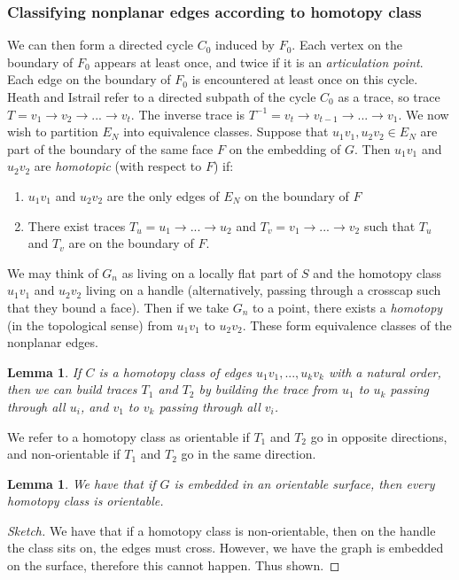 \documentclass[]{report}
\newtheorem{lemma}[theorem]{Lemma}
\theoremstyle{definition}
\numberwithin{theorem}{section}
\numberwithin{equation}{section}
\begin{document}
\subsubsection{Classifying nonplanar edges according to homotopy class}

We can then form a directed cycle $C_0$ induced by $F_0$. Each vertex on the boundary of $F_0$ appears at least once, and twice if it is an \textit{articulation point}. Each edge on the boundary of $F_0$ is encountered at least once on this cycle. Heath and Istrail refer to a directed subpath of the cycle $C_0$ as a trace, so trace $T = v_1 \rightarrow v_2 \rightarrow ... \rightarrow v_t$. The inverse trace is $T^{-1} = v_t \rightarrow v_{t-1} \rightarrow ... \rightarrow v_1$. We now wish to partition $E_N$ into equivalence classes. Suppose that $u_1v_1, u_2v_2 \in E_N$ are part of the boundary of the same face $F$ on the embedding of $G$. Then $u_1v_1$ and $u_2v_2$ are \textit{homotopic} (with respect to $F$) if:
\begin{enumerate}
	\item $u_1v_1$ and $u_2v_2$ are the only edges of $E_N$ on the boundary of $F$
	\item There exist traces $T_u = u_1 \rightarrow ... \rightarrow u_2$ and $T_v = v_1 \rightarrow ... \rightarrow v_2$ such that $T_u$ and $T_v$ are on the boundary of $F$.
\end{enumerate}
We may think of $G_n$ as living on a locally flat part of $S$ and the homotopy class $u_1v_1$ and $u_2 v_2$ living on a handle (alternatively, passing through a crosscap such that they bound a face). Then if we take $G_n$ to a point, there exists a \textit{homotopy} (in the topological sense) from $u_1v_1$ to $u_2v_2$. These form equivalence classes of the nonplanar edges.

\begin{lemma}
	If $C$ is a homotopy class of edges $u_1v_1, ..., u_kv_k$ with a natural order, then we can build traces $T_1$ and $T_2$ by building the trace from $u_1$ to $u_k$ passing through all $u_i$, and $v_1$ to $v_k$ passing through all $v_i$. 
\end{lemma}
We refer to a homotopy class as orientable if $T_1$ and $T_2$ go in opposite directions, and non-orientable if $T_1$ and $T_2$ go in the same direction.

\begin{lemma}
	We have that if $G$ is embedded in an orientable surface, then every homotopy class is orientable.
\end{lemma}
\begin{proof}[Sketch]
	We have that if a homotopy class is non-orientable, then on the handle the class sits on, the edges must cross. However, we have the graph is embedded on the surface, therefore this cannot happen. Thus shown. 
\end{proof}
\end{document}
